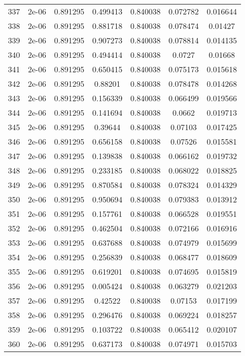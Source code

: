 \begin{table}
\begin{tabular*}{\linewidth}{c|c|c|c|c|c|c}
337 & 2e-06 & 0.891295 & 0.499413 & 0.840038 & 0.072782 & 0.016644\\
338 & 2e-06 & 0.891295 & 0.881718 & 0.840038 & 0.078474 & 0.01427\\
339 & 2e-06 & 0.891295 & 0.907273 & 0.840038 & 0.078814 & 0.014135\\
340 & 2e-06 & 0.891295 & 0.494414 & 0.840038 & 0.0727 & 0.01668\\
341 & 2e-06 & 0.891295 & 0.650415 & 0.840038 & 0.075173 & 0.015618\\
342 & 2e-06 & 0.891295 & 0.88201 & 0.840038 & 0.078478 & 0.014268\\
343 & 2e-06 & 0.891295 & 0.156339 & 0.840038 & 0.066499 & 0.019566\\
344 & 2e-06 & 0.891295 & 0.141694 & 0.840038 & 0.0662 & 0.019713\\
345 & 2e-06 & 0.891295 & 0.39644 & 0.840038 & 0.07103 & 0.017425\\
346 & 2e-06 & 0.891295 & 0.656158 & 0.840038 & 0.07526 & 0.015581\\
347 & 2e-06 & 0.891295 & 0.139838 & 0.840038 & 0.066162 & 0.019732\\
348 & 2e-06 & 0.891295 & 0.233185 & 0.840038 & 0.068022 & 0.018825\\
349 & 2e-06 & 0.891295 & 0.870584 & 0.840038 & 0.078324 & 0.014329\\
350 & 2e-06 & 0.891295 & 0.950694 & 0.840038 & 0.079383 & 0.013912\\
351 & 2e-06 & 0.891295 & 0.157761 & 0.840038 & 0.066528 & 0.019551\\
352 & 2e-06 & 0.891295 & 0.462504 & 0.840038 & 0.072166 & 0.016916\\
353 & 2e-06 & 0.891295 & 0.637688 & 0.840038 & 0.074979 & 0.015699\\
354 & 2e-06 & 0.891295 & 0.256839 & 0.840038 & 0.068477 & 0.018609\\
355 & 2e-06 & 0.891295 & 0.619201 & 0.840038 & 0.074695 & 0.015819\\
356 & 2e-06 & 0.891295 & 0.005424 & 0.840038 & 0.063279 & 0.021203\\
357 & 2e-06 & 0.891295 & 0.42522 & 0.840038 & 0.07153 & 0.017199\\
358 & 2e-06 & 0.891295 & 0.296476 & 0.840038 & 0.069224 & 0.018257\\
359 & 2e-06 & 0.891295 & 0.103722 & 0.840038 & 0.065412 & 0.020107\\
360 & 2e-06 & 0.891295 & 0.637173 & 0.840038 & 0.074971 & 0.015703\\
\end{tabular*}
\end{table}
